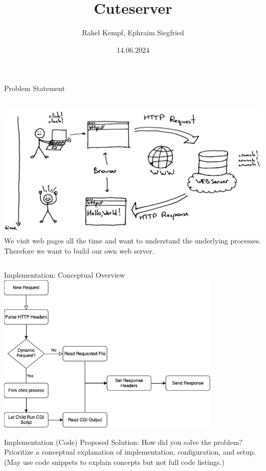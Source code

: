 \documentclass[aspectratio=169]{beamer}
\title              {Cuteserver}
\author             {Rahel Kempf, Ephraim Siegfried}
\institute          {Operating Systems, University of Basel}
\date               {14.06.2024}
\begin{document}
\begin{frame}[t,plain]
\titlepage
\end{frame}

\begin{frame}[c]{Problem Statement}
\begin{columns}[c]
        \includegraphics[width=\textwidth,height=\textheight,keepaspectratio]{webserver-comic.jpg}
   We visit web pages all the time and want to understand the underlying processes. Therefore we want to build our own web server.
\end{columns}
\end{frame}

\begin{frame}[c]{Implementation: Conceptual Overview}
    \centering
    \includegraphics[width=0.8\textwidth,height=0.8\textheight,keepaspectratio]{web_server_inner_workings.png}
\end{frame}

\begin{frame}[c]{Implementation (Code)}
    Proposed Solution: How did you solve the problem? Prioritize a conceptual
    explanation of implementation, configuration, and setup. (May use code
    snippets to explain concepts but not full code listings.)
\end{frame}
\end{document}
